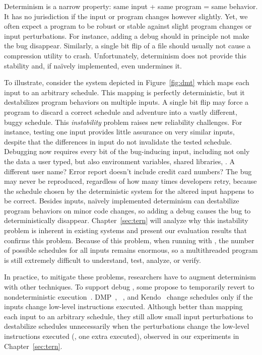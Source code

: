  Determinism is a
narrow property: same input + same program = same behavior. It has no
jurisdiction if the input or program changes however slightly.  Yet, we
often expect a program to be robust or stable against slight program
changes or input perturbations.  For instance, adding a debug 
should in principle not make the bug disappear.  Similarly, a single bit flip of
a file should usually not cause a compression utility to crash. Unfortunately,
determinism does not provide this stability and, if na\"{i}vely implemented,
even undermines it.

To illustrate, consider the system depicted in
Figure~\ref{fig:dmt} which maps each input to an arbitrary schedule. This
mapping is perfectly deterministic, but it destabilizes program
behaviors on multiple inputs.  A single bit flip may force a program to
discard a correct schedule and adventure into a vastly different, buggy
schedule. This \emph{instability} problem raises new reliability challenges. 
For instance, testing one input provides little assurance on very similar
inputs, despite that the differences in input do not invalidate the tested
schedule. Debugging now requires every bit of the bug-inducing input, including
not only the data a user typed, but also environment variables, shared
libraries, \etc. A different user name?  Error report doesn't include credit
card numbers? The bug may never be reproduced, regardless of how many times
developers retry, because the schedule chosen by the deterministic system for
the altered input happens to be correct. Besides inputs, na\"{i}vely implemented
determinism can destabilize program behaviors on minor code changes, so adding a
debug  causes the bug to deterministically disappear.
Chapter~\ref{sec:tern} will analyze why this instability problem is
inherent in existing \dmt systems and present our evaluation results
that confirms this problem. Because of this problem, when running with
\dmt, the number of possible schedules for all inputs remains enormous, so a
multithreaded program is still extremely difficult to understand, test, analyze,
or verify.

In practice, to mitigate these problems, researchers have to augment
determinism with other techniques.  To support debug , some
propose to temporarily revert to nondeterministic
execution~\cite{dmp:asplos09}.  DMP~\cite{dmp:asplos09},
\coredet~\cite{coredet:asplos10}, and Kendo~\cite{kendo:asplos09} change
schedules only if the inputs change low-level instructions executed.
Although better than mapping each input to an arbitrary schedule, they
still allow small input perturbations to destabilize schedules
unnecessarily when the perturbations change the low-level instructions
executed (\eg, one extra  executed), observed in our
experiments in Chapter~\ref{sec:tern}.

